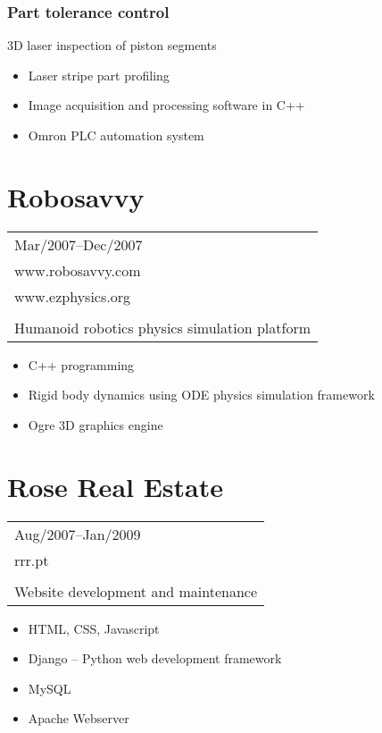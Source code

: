 \documentclass[a4paper,english]{article}
\begin{document}
    \subsubsection*{Part tolerance control}
        3D laser inspection of piston segments
        \begin{itemize}
        \setlength{\itemsep}{-1mm}
            \item[] Laser stripe part profiling
            \item[] Image acquisition and processing software in C++
            \item[] Omron PLC automation system
        \end{itemize}
    \vspace{0.5cm}
\section*{Robosavvy}
    \begin{tabular}{l}
        Mar/2007--Dec/2007 \\
        www.robosavvy.com \\
        www.ezphysics.org \\
        \\
        Humanoid robotics physics simulation platform \\
    \end{tabular}
    \begin{itemize}
    \setlength{\itemsep}{-1mm}
        \item[] C++ programming
        \item[] Rigid body dynamics using ODE physics simulation framework
        \item[] Ogre 3D graphics engine
    \end{itemize}
    \vspace{0.5cm}
\section*{Rose Real Estate}
    \begin{tabular}{l}
        Aug/2007--Jan/2009 \\
        rrr.pt \\
        \\
        Website development and maintenance \\
    \end{tabular}
    \begin{itemize}
    \setlength{\itemsep}{-1mm}
        \item[] HTML, CSS, Javascript
        \item[] Django -- Python web development framework
        \item[] MySQL
        \item[] Apache Webserver
    \end{itemize}
    \vspace{0.5cm}
\end{document}
